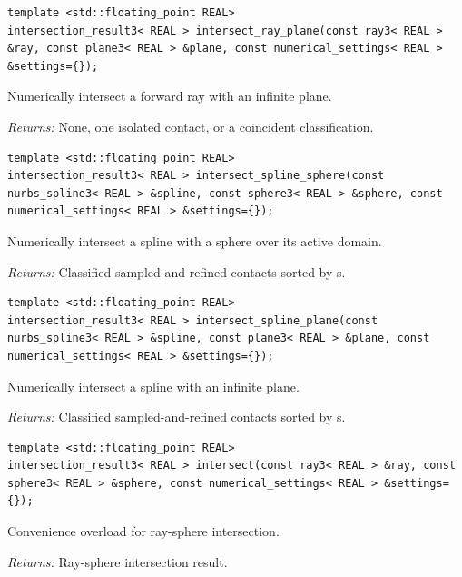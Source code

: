 \par\noindent\begin{minipage}{\linewidth}
\begin{lstlisting}[style=apireference]
template <std::floating_point REAL>
intersection_result3< REAL > intersect_ray_plane(const ray3< REAL > &ray, const plane3< REAL > &plane, const numerical_settings< REAL > &settings={});
\end{lstlisting}
{\footnotesize Numerically intersect a forward ray with an infinite plane.\par}
{\footnotesize\textit{Returns:} None, one isolated contact, or a coincident classification.\par}
\end{minipage}\par\vspace{1pt}
\par\noindent\begin{minipage}{\linewidth}
\begin{lstlisting}[style=apireference]
template <std::floating_point REAL>
intersection_result3< REAL > intersect_spline_sphere(const nurbs_spline3< REAL > &spline, const sphere3< REAL > &sphere, const numerical_settings< REAL > &settings={});
\end{lstlisting}
{\footnotesize Numerically intersect a spline with a sphere over its active domain.\par}
{\footnotesize\textit{Returns:} Classified sampled-and-refined contacts sorted by s.\par}
\end{minipage}\par\vspace{1pt}
\par\noindent\begin{minipage}{\linewidth}
\begin{lstlisting}[style=apireference]
template <std::floating_point REAL>
intersection_result3< REAL > intersect_spline_plane(const nurbs_spline3< REAL > &spline, const plane3< REAL > &plane, const numerical_settings< REAL > &settings={});
\end{lstlisting}
{\footnotesize Numerically intersect a spline with an infinite plane.\par}
{\footnotesize\textit{Returns:} Classified sampled-and-refined contacts sorted by s.\par}
\end{minipage}\par\vspace{1pt}
\par\noindent\begin{minipage}{\linewidth}
\begin{lstlisting}[style=apireference]
template <std::floating_point REAL>
intersection_result3< REAL > intersect(const ray3< REAL > &ray, const sphere3< REAL > &sphere, const numerical_settings< REAL > &settings={});
\end{lstlisting}
{\footnotesize Convenience overload for ray-sphere intersection.\par}
{\footnotesize\textit{Returns:} Ray-sphere intersection result.\par}
\end{minipage}\par\vspace{1pt}
